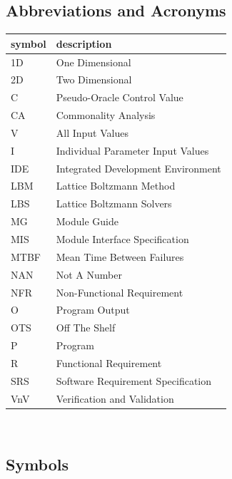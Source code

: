 \documentclass[12pt, titlepage]{article}
\begin{document}
\subsection{Abbreviations and Acronyms}
\renewcommand{\arraystretch}{1.2}
\begin{tabular}{l l} 
  \toprule		
  \textbf{symbol} & \textbf{description}\\
  \midrule 
  1D & One Dimensional\\
  2D & Two Dimensional\\
  C & Pseudo-Oracle Control Value\\
  CA & Commonality Analysis\\
  V & All Input Values\\
  I & Individual Parameter Input Values\\
  IDE & Integrated Development Environment\\
  LBM & Lattice Boltzmann Method\\
  LBS & Lattice Boltzmann Solvers\\
  MG & Module Guide\\
  MIS & Module Interface Specification\\
  MTBF & Mean Time Between Failures\\
  NAN & Not A Number\\
  NFR & Non-Functional Requirement\\
  O & Program Output\\
  OTS & Off The Shelf\\
  P & Program\\
  R & Functional Requirement\\
  SRS & Software Requirement Specification\\
  VnV & Verification and Validation\\
  \bottomrule
\end{tabular}\\

\newpage

\subsection{Symbols}
\end{document}

